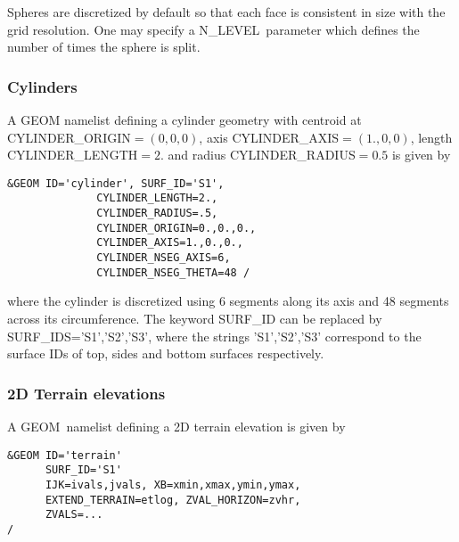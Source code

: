 \documentclass[12pt]{article}
\begin{document}
\noindent Spheres are discretized by default so that each face is consistent in size with the grid resolution.
One may specify a {\ct N\_LEVEL}\ parameter which defines the number of times the sphere is split.


\subsubsection{Cylinders}
\label{info:GEOM_cyls}

A {\ct GEOM} namelist defining a cylinder geometry with centroid at {\ct CYLINDER\_ORIGIN}$=(0,0,0)$, axis {\ct CYLINDER\_AXIS}$=(1.,0,0)$, length {\ct CYLINDER\_LENGTH}$=2.$ and radius {\ct CYLINDER\_RADIUS}$=0.5$ is given by

\begin{verbatim}
&GEOM ID='cylinder', SURF_ID='S1',
              CYLINDER_LENGTH=2.,
              CYLINDER_RADIUS=.5,
              CYLINDER_ORIGIN=0.,0.,0.,
              CYLINDER_AXIS=1.,0.,0.,
              CYLINDER_NSEG_AXIS=6,
              CYLINDER_NSEG_THETA=48 /
 \end{verbatim}

where the cylinder is discretized using 6 segments along its axis and 48 segments across its circumference. The keyword {\ct SURF\_ID} can be replaced by {\ct SURF\_IDS='S1','S2','S3'}, where the strings {\ct 'S1','S2','S3'} correspond to the surface IDs of top, sides and bottom surfaces respectively.


\subsubsection{2D Terrain elevations}
A {\ct GEOM}\ namelist defining a 2D terrain elevation is given by

\begin{verbatim}
&GEOM ID='terrain'
      SURF_ID='S1'
      IJK=ivals,jvals, XB=xmin,xmax,ymin,ymax,
      EXTEND_TERRAIN=etlog, ZVAL_HORIZON=zvhr,
      ZVALS=...
/
\end{verbatim}
\end{document}
